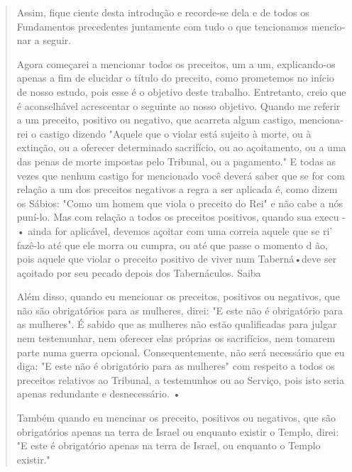 \begin{quote}
Assim, fique ciente desta introdução e recorde-se dela e de todos os
Fundamentos precedentes juntamente com tudo o que tencionamos mencio­nar
a seguir.

Agora começarei a mencionar todos os preceitos, um a um, expli­cando-os
apenas a fim de elucidar o título do preceito, como prometemos no início
de nosso estudo, pois esse é o objetivo deste trabalho. Entretanto,
creio que é aconselhável acrescentar o seguinte ao nosso objetivo.
Quando me refe­rir a um preceito, positivo ou negativo, que acarreta
algum castigo, menciona­rei o castigo dizendo "Aquele que o violar está
sujeito à morte, ou à extinção, ou a oferecer determinado sacrifício, ou
ao açoitamento, ou a uma das penas de morte impostas pelo Tribunal, ou a
pagamento." E todas as vezes que ne­nhum castigo for mencionado você
deverá saber que se for com relação a um dos preceitos negativos a regra
a ser aplicada é, como dizem os Sábios: "Como um homem que viola o
preceito do Rei" e não cabe a nós puní-lo. Mas com relação a todos os
preceitos positivos, quando sua execu - • ainda for aplicável, 
devemos açoitar com uma correia aquele que se ri' fazê-lo até que
ele morra ou cumpra, ou até que passe o momento d ão, pois aquele
que violar o preceito positivo de viver num Taberná•deve ser açoi­tado
por seu pecado depois dos Tabernáculos. Saiba

Além disso, quando eu mencionar os preceitos, positivos ou negati­vos,
que não são obrigatórios para as mulheres, direi: "E este não é
obrigatório para as mulheres". É sabido que as mulheres não estão
qualificadas para julgar nem testemunhar, nem oferecer elas próprias os
sacrifícios, nem tomarem par­te numa guerra opcional. Consequentemente,
não será necessário que eu diga: "E este não é obrigatório para as
mulheres" com respeito a todos os preceitos relativos ao Tribunal, a
testemunhos ou ao Serviço, pois isto seria apenas re­dundante e
desnecessário. •

Também quando eu mencinar os preceito, positivos ou negativos, que são
obrigatórios apenas na terra de Israel ou enquanto existir o Templo,
direi: "E este é obrigatório apenas na terra de Israel, ou enquanto o
Templo existir."


\end{quote}
